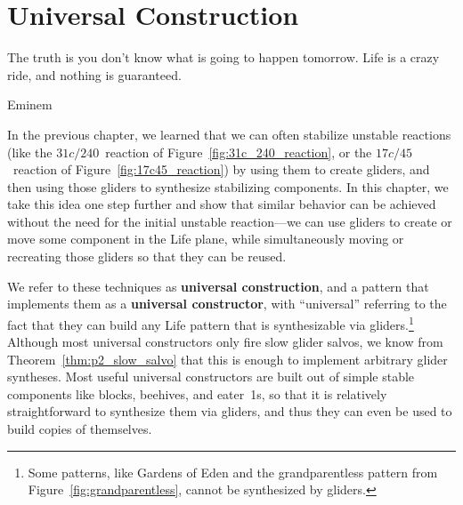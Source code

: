 
\renewcommand{\chapterfolder}{universal_construction/}
\chapter{Universal Construction}\label{chp:universal_construction}


\vspace*{-0.4in}
\epigraph{The truth is you don't know what is going to happen tomorrow. Life is a crazy ride, and nothing is guaranteed.}{Eminem}
\vspace*{0.4in}



\noindent In the previous chapter, we learned that we can often stabilize unstable reactions (like the $31c/240$~reaction of Figure~\ref{fig:31c_240_reaction}, or the $17c/45$~reaction of Figure~\ref{fig:17c45_reaction}) by using them to create gliders, and then using those gliders to synthesize stabilizing components. In this chapter, we take this idea one step further and show that similar behavior can be achieved without the need for the initial unstable reaction---we can use gliders to create or move some component in the Life plane, while simultaneously moving or recreating those gliders so that they can be reused.

We refer to these techniques as \textbf{universal construction}, and a pattern that implements them as a \textbf{universal constructor}, with ``universal'' referring to the fact that they can build any Life pattern that is synthesizable via gliders.\footnote{Some patterns, like Gardens of Eden and the grandparentless pattern from Figure~\ref{fig:grandparentless}, cannot be synthesized by gliders.} Although most universal constructors only fire slow glider salvos, we know from Theorem~\ref{thm:p2_slow_salvo} that this is enough to implement arbitrary glider syntheses. Most useful universal constructors are built out of simple stable components like blocks, beehives, and eater~1s, so that it is relatively straightforward to synthesize them via gliders, and thus they can even be used to build copies of themselves.

